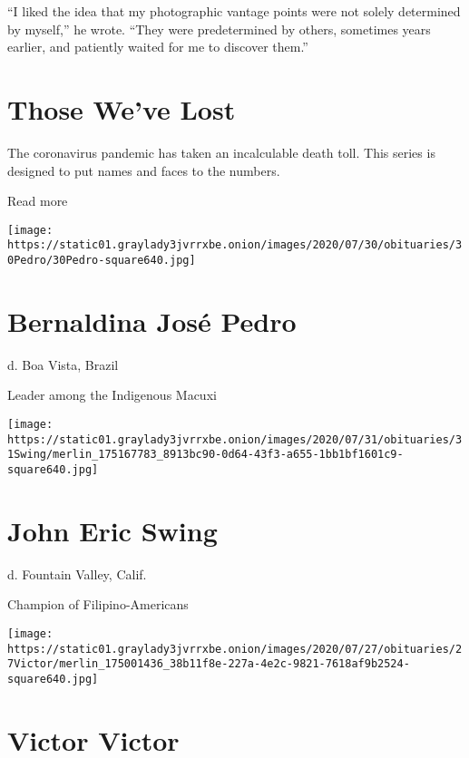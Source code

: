 ``I liked the idea that my photographic vantage points were not solely
determined by myself,'' he wrote. ``They were predetermined by others,
sometimes years earlier, and patiently waited for me to discover them.''

\href{https://www.nytimes3xbfgragh.onion/interactive/2020/obituaries/people-died-coronavirus-obituaries.html?action=click\&pgtype=Article\&state=default\&region=BELOW_MAIN_CONTENT\&context=covid_obits_promo}{}

\hypertarget{those-weve-lost}{%
\section{Those We've Lost}\label{those-weve-lost}}

The coronavirus pandemic has taken an incalculable death toll. This
series is designed to put names and faces to the numbers.

Read more

\texttt{[image: https://static01.graylady3jvrrxbe.onion/images/2020/07/30/obituaries/30Pedro/30Pedro-square640.jpg]}

\hypertarget{bernaldina-josuxe9-pedro}{%
\section{Bernaldina José Pedro}\label{bernaldina-josuxe9-pedro}}

d. Boa Vista, Brazil

Leader among the Indigenous Macuxi

\texttt{[image: https://static01.graylady3jvrrxbe.onion/images/2020/07/31/obituaries/31Swing/merlin\_175167783\_8913bc90-0d64-43f3-a655-1bb1bf1601c9-square640.jpg]}

\hypertarget{john-eric-swing}{%
\section{John Eric Swing}\label{john-eric-swing}}

d. Fountain Valley, Calif.

Champion of Filipino-Americans

\texttt{[image: https://static01.graylady3jvrrxbe.onion/images/2020/07/27/obituaries/27Victor/merlin\_175001436\_38b11f8e-227a-4e2c-9821-7618af9b2524-square640.jpg]}

\hypertarget{victor-victor}{%
\section{Victor Victor}\label{victor-victor}}

